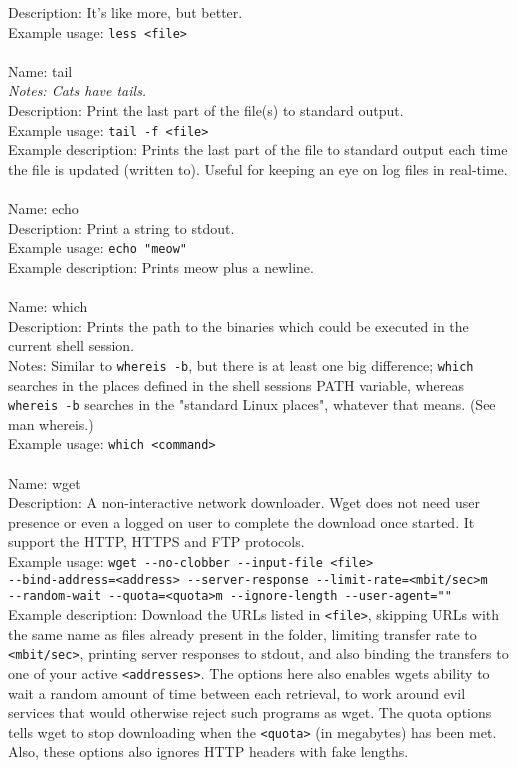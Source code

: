 \documentclass[a4paper,10pt]{article}
\begin{document}
Description: It's like more, but better.
\\
Example usage: \verb!less <file>!
\\
\\
Name: tail
\\
\textit{Notes: Cats have tails.}
\\
Description: Print the last part of the file(s) to standard output.
\\
Example usage: \verb!tail -f <file>!
\\
Example description: Prints the last part of the file to standard output each time the file is updated (written to). Useful for keeping an eye on log files in real-time.
\\
\\
Name: echo
\\
Description: Print a string to stdout.
\\
Example usage: \verb!echo "meow"!
\\
Example description: Prints meow plus a newline.
\\
\\
Name: which
\\
Description: Prints the path to the binaries which could be executed in the current shell session.
\\
Notes: Similar to \verb!whereis -b!, but there is at least one big difference; \verb!which! searches in the places defined in the shell sessions PATH variable, whereas \verb!whereis -b! searches in the "standard Linux places", whatever that means. (See man whereis.)
\\
Example usage: \verb!which <command>!
\\
\\
Name: wget
\\
Description: A non-interactive network downloader. Wget does not need user presence or even a logged on user to complete the download once started. It support the HTTP, HTTPS and FTP protocols.
\\
Example usage: \verb!wget --no-clobber --input-file <file>!\\ 
\verb!--bind-address=<address> --server-response --limit-rate=<mbit/sec>m !\\
\verb!--random-wait --quota=<quota>m --ignore-length --user-agent=""!
\\
Example description: Download the URLs listed in \verb!<file>!, skipping URLs with the same name as files already present in the folder, limiting transfer rate to \verb!<mbit/sec>!, printing server responses to stdout, and also binding the transfers to one of your active \verb!<addresses>!. The options here also enables wgets ability to wait a random amount of time between each retrieval, to work around evil services that would otherwise reject such programs as wget. The quota options tells wget to stop downloading when the \verb!<quota>! (in megabytes) has been met. Also, these options also ignores HTTP headers with fake lengths.
\end{document}
